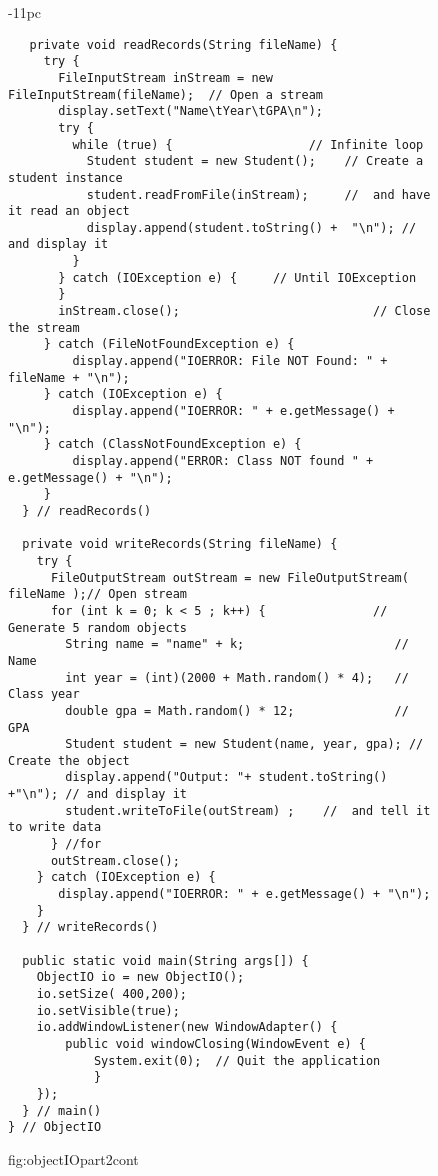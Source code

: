\begin{figure}[p]
\addtocounter{figure}{-1}
\jjjprogstart
\begin{jjjlistingleft}[37pc]{-11pc}
\begin{lstlisting}
   private void readRecords(String fileName) {
     try {
       FileInputStream inStream = new FileInputStream(fileName);  // Open a stream
       display.setText("Name\tYear\tGPA\n");
       try {
         while (true) {                   // Infinite loop
           Student student = new Student();    // Create a student instance
           student.readFromFile(inStream);     //  and have it read an object
           display.append(student.toString() +  "\n"); //  and display it
         }
       } catch (IOException e) {     // Until IOException
       }
       inStream.close();                           // Close the stream
     } catch (FileNotFoundException e) {
         display.append("IOERROR: File NOT Found: " + fileName + "\n");
     } catch (IOException e) {
         display.append("IOERROR: " + e.getMessage() + "\n");
     } catch (ClassNotFoundException e) {
         display.append("ERROR: Class NOT found " + e.getMessage() + "\n");
     }
  } // readRecords()

  private void writeRecords(String fileName) {
    try {
      FileOutputStream outStream = new FileOutputStream( fileName );// Open stream
      for (int k = 0; k < 5 ; k++) {               // Generate 5 random objects
        String name = "name" + k;                     // Name
        int year = (int)(2000 + Math.random() * 4);   // Class year
        double gpa = Math.random() * 12;              // GPA
        Student student = new Student(name, year, gpa); // Create the object
        display.append("Output: "+ student.toString() +"\n"); // and display it
        student.writeToFile(outStream) ;    //  and tell it to write data
      } //for
      outStream.close();
    } catch (IOException e) {
       display.append("IOERROR: " + e.getMessage() + "\n");
    }
  } // writeRecords()

  public static void main(String args[]) {
    ObjectIO io = new ObjectIO();
    io.setSize( 400,200);
    io.setVisible(true);
    io.addWindowListener(new WindowAdapter() {  
        public void windowClosing(WindowEvent e) {
            System.exit(0);  // Quit the application
            }
    });
  } // main()
} // ObjectIO
\end{lstlisting}
\end{jjjlistingleft}
{fig:objectIOpart2cont}
\end{figure}


